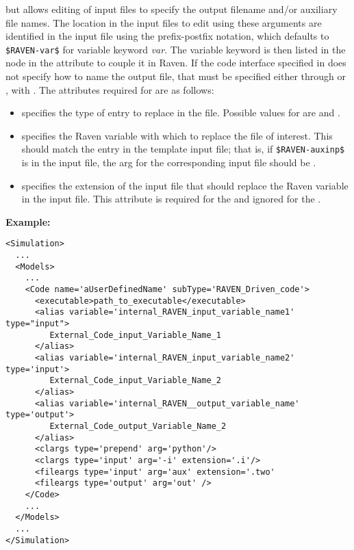 \begin{itemize}
  but allows editing of input files to specify the output filename and/or auxiliary
  file names.
  The location in the input files to edit using these arguments are identified in
  the input file using the prefix-postfix notation, which defaults to
  \texttt{\$RAVEN-var\$} for variable keyword \emph{var}.  The variable keyword
  is then listed in the  node in the attribute  to
  couple it in Raven.
  If the code interface specified in  
  does not specify how to name the output file, that must be specified either through
   or , with  .
  The attributes required for  are as follows:
  \begin{itemize}
    \item {}  specifies the type
    of entry to replace in the file.  Possible values for 
     are  and .
    \item {}  specifies the Raven
    variable with which to replace the file of interest.  This should match
    the entry in the template input file; that is, if \texttt{\$RAVEN-auxinp\$}
    is in the input file, the arg for the corresponding input file should be
    .
    \item {}  specifies the
    extension of the input file that should replace the Raven variable in
    the input file.  This attribute is required for the  
    and ignored for the  .
  \end{itemize}
\end{itemize}
\textbf{Example:}
\begin{lstlisting}[style=XML,morekeywords={subType,name,variable}]
<Simulation>
  ...
  <Models>
    ...
    <Code name='aUserDefinedName' subType='RAVEN_Driven_code'>
      <executable>path_to_executable</executable>
      <alias variable='internal_RAVEN_input_variable_name1' type="input">
         External_Code_input_Variable_Name_1
      </alias>
      <alias variable='internal_RAVEN_input_variable_name2' type='input'>
         External_Code_input_Variable_Name_2
      </alias>
      <alias variable='internal_RAVEN__output_variable_name' type='output'>
         External_Code_output_Variable_Name_2
      </alias>
      <clargs type='prepend' arg='python'/>
      <clargs type='input' arg='-i' extension='.i'/>
      <fileargs type='input' arg='aux' extension='.two'
      <fileargs type='output' arg='out' />
    </Code>
    ...
  </Models>
  ...
</Simulation>
\end{lstlisting}

